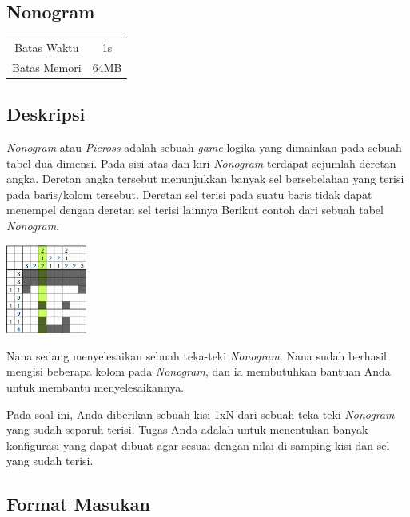 \documentclass{article}
\begin{document}
\begin{center}
    \section*{Nonogram} %

    \begin{tabular}{ | c c | }
        \hline
        Batas Waktu  & 1s \\    %
        Batas Memori & 64MB \\  %
        \hline
    \end{tabular}
\end{center}

\subsection*{Deskripsi}

\textit{Nonogram} atau \textit{Picross} adalah sebuah \textit{game} logika yang dimainkan pada sebuah tabel dua dimensi.
Pada sisi atas dan kiri \textit{Nonogram} terdapat sejumlah deretan angka.
Deretan angka tersebut menunjukkan banyak sel bersebelahan yang terisi pada baris/kolom tersebut.
Deretan sel terisi pada suatu baris tidak dapat menempel dengan deretan sel terisi lainnya
Berikut contoh dari sebuah tabel \textit{Nonogram}.

\includegraphics[width=100px]{Homogram-Steve}

Nana sedang menyelesaikan sebuah teka-teki \textit{Nonogram}. 
Nana sudah berhasil mengisi beberapa kolom pada \textit{Nonogram}, dan ia membutuhkan bantuan Anda untuk membantu menyelesaikannya.

Pada soal ini, Anda diberikan sebuah kisi 1xN dari sebuah teka-teki \textit{Nonogram} yang sudah separuh terisi.
Tugas Anda adalah untuk menentukan banyak konfigurasi yang dapat dibuat agar sesuai dengan nilai di samping kisi dan sel yang sudah terisi.

\subsection*{Format Masukan}
\end{document}

